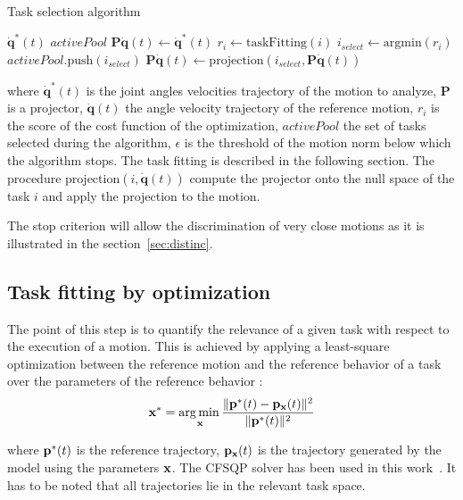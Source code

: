 \documentclass[letterpaper, 10pt, conference]{ieeeconf}      %
\begin{document}
\begin{algorithm}
  \caption{Task selection algorithm}
  \label{alg:taskSelection}
\begin{algorithmic}[1]
  \STATE \shINPUT $\mathbf{\dot{q}}^{*}(t)$
\STATE \shOUTPUT $activePool$
\STATE $\mathbf{P}\mathbf{\dot{q}}(t)\gets \mathbf{\dot{q}}^{*}(t)$
    \STATE $r_i \gets \mathrm{taskFitting}(i)$
  \ENDFOR
  \STATE $i_{select} \gets \mathrm{argmin}(r_i)$
  \STATE $activePool.\mathrm{push}(i_{select})$
  \STATE $\mathbf{P}\mathbf{\dot{q}}(t) \gets \mathrm{projection}(i_{select}, \mathbf{P}\mathbf{\dot{q}}(t))$
\ENDWHILE
\end{algorithmic}
\end{algorithm}
where  $\mathbf{\dot{q}}^{*}(t)$ is the joint angles velocities trajectory of the motion to analyze,
$\mathbf{P}$ is a projector, $\mathbf{\dot{q}}(t)$ the angle velocity trajectory
of the reference motion, $r_i$ is the score of the cost function of the optimization, $activePool$
the set of tasks selected during the algorithm, $\epsilon$ is the threshold
of the motion norm below which the algorithm stops. The task fitting is described
in the following section. The procedure $\mathrm{projection}(i, \mathbf{\dot{q}}(t))$ compute the projector onto
the null space of the task $i$ and apply the projection to the motion.

The stop criterion will allow the discrimination of very close motions as it is illustrated in
the section~\ref{sec:distinc}.

\subsection{Task fitting by optimization} \label{sec:alg2:proj}
The point of this step is to quantify the relevance of a given task with respect to
the execution of a motion. This is achieved by applying a least-square optimization
between the reference motion and the reference behavior of a task over the parameters
of the reference behavior :
\begin{equation}
	{\mathbf{x}}^* = \underset{{\mathbf{x}}}{\operatorname*{arg\,min\,}} \frac{\Vert {\mathbf{p}}^*(t) - {\mathbf{p}}_{\mathbf{x}}(t) \Vert^2}{\Vert {\mathbf{p}}^*(t) \Vert^2}
\label{optimProblem}
\end{equation}

\noindent where ${\mathbf{p}}^*(t)$ is the reference trajectory, ${\mathbf{p}}_{\mathbf{x}}(t)$ is the trajectory
generated by the model using the parameters ${\mathbf{x}}$. The CFSQP solver has been used in this work~\cite{lawrence97}.
It has to be noted that all trajectories lie in the relevant task space.
\end{document}

